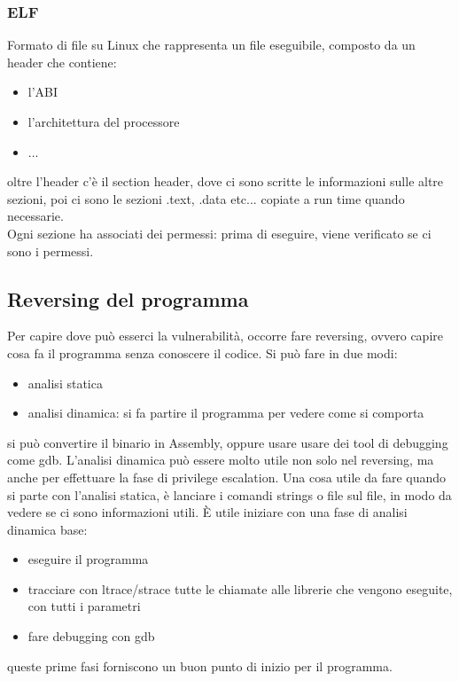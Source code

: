 \documentclass{article}
\begin{document}
\subsubsection{ELF}
Formato di file su Linux che rappresenta un file eseguibile, composto da un header che contiene:
\begin{itemize}
\item l'ABI
\item l'architettura del processore
\item ...
\end{itemize}
oltre l'header c'è il section header, dove ci sono scritte le informazioni sulle altre sezioni, poi ci sono le sezioni .text, .data etc... copiate a run time quando necessarie.\\ Ogni sezione ha associati dei permessi: prima di eseguire, viene verificato se ci sono i permessi.\\
\subsection{Reversing del programma}
Per capire dove può esserci la vulnerabilità, occorre fare reversing, ovvero capire cosa fa il programma senza conoscere il codice. Si può fare in due modi:
\begin{itemize}
\item analisi statica
\item analisi dinamica: si fa partire il programma per vedere come si comporta
\end{itemize}
si può convertire il binario in Assembly, oppure usare usare dei tool di debugging come gdb. L'analisi dinamica può essere molto utile non solo nel reversing, ma anche per effettuare la fase di privilege escalation. Una cosa utile da fare quando si parte con l'analisi statica, è lanciare i comandi strings o file sul file, in modo da vedere se ci sono informazioni utili. È utile iniziare con una fase di analisi dinamica base:
\begin{itemize}
\item eseguire il programma
\item tracciare con ltrace/strace tutte le chiamate alle librerie che vengono eseguite, con tutti i parametri
\item fare debugging con gdb
\end{itemize}
queste prime fasi forniscono un buon punto di inizio per il programma.
\end{document}
